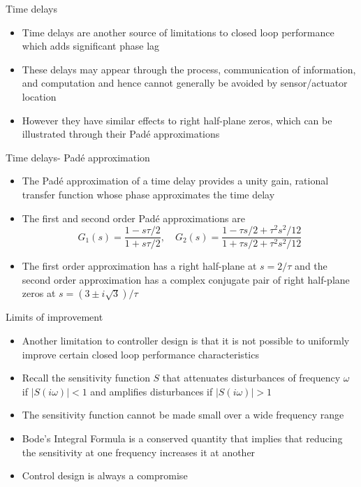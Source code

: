 \documentclass{beamer-control}
\begin{document}
\begin{frame}{Time delays}
	\begin{itemize}
		\item Time delays are another source of limitations to closed loop performance which adds significant phase lag
		\item These delays may appear through the process, communication of information, and computation and hence cannot generally be avoided by sensor/actuator location
		\item However they have similar effects to right half-plane zeros, which can be illustrated through their Pad\'{e} approximations
	\end{itemize}
\end{frame}


\begin{frame}{Time delays- Pad\'{e} approximation}
\begin{itemize}
	\item The Pad\'{e} approximation of a time delay provides a unity gain, rational transfer function whose phase approximates the time delay
	\item The first and second order Pad\'{e} approximations are
	\[G_1(s)=\frac{1-s\tau/2}{1+s\tau/2}, \quad G_2(s)=\frac{1-\tau s/2 + \tau^2 s^2/12}{1+\tau s/2 + \tau^2 s^2/12}\]
	\item The first order approximation has a right half-plane at $s=2/\tau$ and the second order approximation has a complex conjugate pair of right half-plane zeros at $s=(3\pm i\sqrt{3})/\tau$
\end{itemize}
\end{frame}



\begin{frame}{Limits of improvement}
\begin{itemize}
	\item Another limitation to controller design is that it is not possible to uniformly improve certain closed loop performance characteristics
	\item Recall the sensitivity function $S$ that attenuates disturbances of frequency $\omega$ if $|S(i\omega)|<1$ and amplifies disturbances if $|S(i\omega)|>1$
	\item The sensitivity function cannot be made small over a wide frequency range
	\item Bode's Integral Formula is a conserved quantity that implies that reducing the sensitivity at one frequency increases it at another
	\item Control design is always a compromise
\end{itemize}
\end{frame}
\end{document}
